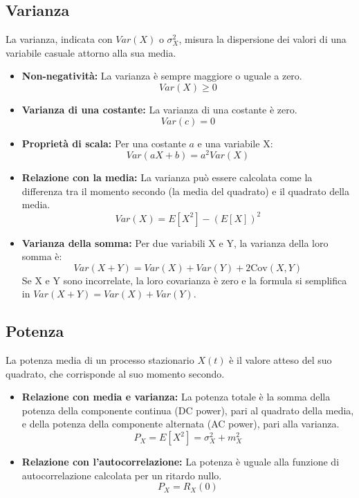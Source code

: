 \subsection{Varianza}
La varianza, indicata con $Var(X)$ o $\sigma_X^2$, misura la dispersione dei valori di una variabile casuale attorno alla sua media.

\begin{itemize}
    \item \textbf{Non-negatività:} La varianza è sempre maggiore o uguale a zero.
    $$ Var(X) \ge 0 $$
    
    \item \textbf{Varianza di una costante:} La varianza di una costante è zero.
    $$ Var(c) = 0 $$
    
    \item \textbf{Proprietà di scala:} Per una costante $a$ e una variabile X:
    $$ Var(aX + b) = a^2 Var(X) $$
    
    \item \textbf{Relazione con la media:} La varianza può essere calcolata come la differenza tra il momento secondo (la media del quadrato) e il quadrato della media.
    $$ Var(X) = E[X^2] - (E[X])^2 $$
    
    \item \textbf{Varianza della somma:} Per due variabili X e Y, la varianza della loro somma è:
    $$ Var(X + Y) = Var(X) + Var(Y) + 2\text{Cov}(X, Y) $$
    Se X e Y sono incorrelate, la loro covarianza è zero e la formula si semplifica in $Var(X + Y) = Var(X) + Var(Y)$.
\end{itemize}


\subsection{Potenza}
La potenza media di un processo stazionario $X(t)$ è il valore atteso del suo quadrato, che corrisponde al suo momento secondo.

\begin{itemize}
    \item \textbf{Relazione con media e varianza:} La potenza totale è la somma della potenza della componente continua (DC power), pari al quadrato della media, e della potenza della componente alternata (AC power), pari alla varianza.
    $$ P_X = E[X^2] = \sigma_X^2 + m_X^2 $$
    
    \item \textbf{Relazione con l'autocorrelazione:} La potenza è uguale alla funzione di autocorrelazione calcolata per un ritardo nullo.
    $$ P_X = R_X(0) $$
\end{itemize}


